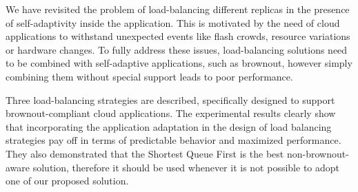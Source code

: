 We have revisited the problem of load-balancing
different replicas in the presence of self-adaptivity inside the application.
This is motivated by the need of cloud applications to withstand unexpected events
like flash crowds, resource variations or hardware changes.
To fully address these issues, load-balancing solutions need to be combined
with self-adaptive applications, such as brownout, however simply combining
them without special support leads to poor performance.

Three load-balancing strategies are described, specifically
designed to support brownout-compliant cloud applications.
The experimental results clearly show that
incorporating the application adaptation in the design of load
balancing strategies pay off in terms of predictable behavior and
maximized performance. They also demonstrated that the Shortest Queue
First is the best non-brownout-aware solution, therefore it should be
used whenever it is not possible to adopt one of our proposed solution.


